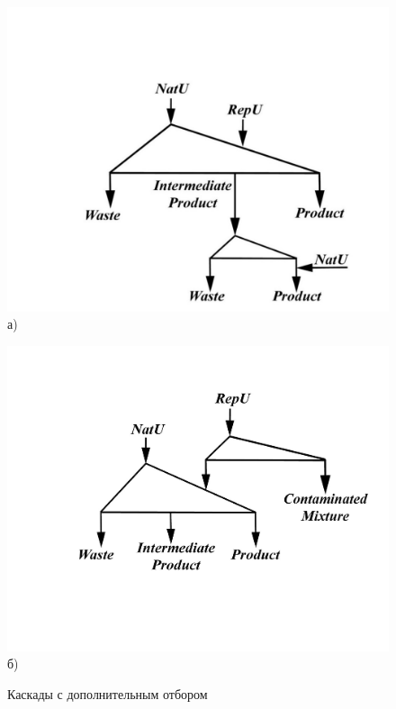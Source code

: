 \begin{figure}[ht]
  \begin{minipage}[b][][b]{0.49\linewidth}\centering
    \includegraphics[width=0.9\linewidth]{cascades/add_p} \\ а)
  \end{minipage}
  \hfill
  \begin{minipage}[b][][b]{0.49\linewidth}\centering
    \includegraphics[width=0.9\linewidth]{cascades/add_p2} \\ б)
  \end{minipage}
  \caption{Каскады с дополнительным отбором}
  \label{fig:add}
\end{figure}


